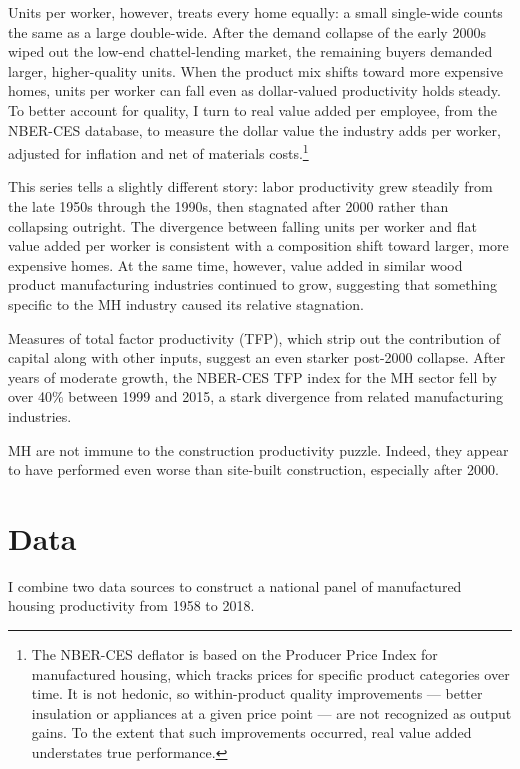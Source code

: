 \documentclass[11pt,article,oneside]{memoir}
\begin{document}
Units per worker, however, treats every home equally: a small
single-wide counts the same as a large double-wide. After the demand
collapse of the early 2000s wiped out the low-end chattel-lending
market, the remaining buyers demanded larger, higher-quality units. When
the product mix shifts toward more expensive homes, units per worker can
fall even as dollar-valued productivity holds steady. To better account
for quality, I turn to real value added per employee, from the NBER-CES
database, to measure the dollar value the industry adds per worker,
adjusted for inflation and net of materials costs.\footnote{The NBER-CES
  deflator is based on the Producer Price Index for manufactured
  housing, which tracks prices for specific product categories over
  time. It is not hedonic, so within-product quality improvements ---
  better insulation or appliances at a given price point --- are not
  recognized as output gains. To the extent that such improvements
  occurred, real value added understates true performance.}

This series tells a slightly different story: labor productivity grew
steadily from the late 1950s through the 1990s, then stagnated after
2000 rather than collapsing outright. The divergence between falling
units per worker and flat value added per worker is consistent with a
composition shift toward larger, more expensive homes. At the same time,
however, value added in similar wood product manufacturing industries
continued to grow, suggesting that something specific to the MH industry
caused its relative stagnation.

Measures of total factor productivity (TFP), which strip out the
contribution of capital along with other inputs, suggest an even starker
post-2000 collapse. After years of moderate growth, the NBER-CES TFP
index for the MH sector fell by over 40\% between 1999 and 2015, a stark
divergence from related manufacturing industries.

MH are not immune to the construction productivity puzzle. Indeed, they
appear to have performed even worse than site-built construction,
especially after 2000.

\hypertarget{data}{%
\section{Data}\label{data}}

I combine two data sources to construct a national panel of manufactured
housing productivity from 1958 to 2018.
\end{document}
